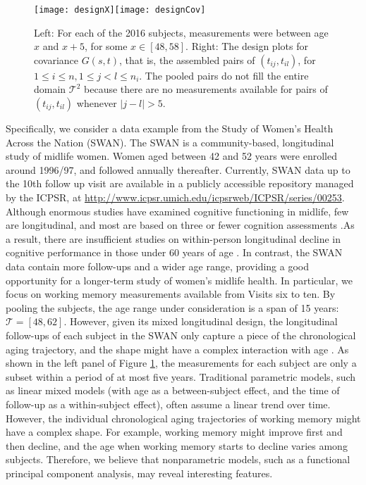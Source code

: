 \documentclass[11pt]{article}
\newcommand{\0}{{\mathbf{0}}}
\newcommand{\1}{{\mathbf{1}}}
\begin{document}
\begin{figure}[ht]
	\centerline{
		\texttt{[image: designX]}\texttt{[image: designCov]}	}
	\caption{Left: For each of the 2016 subjects, measurements were between age $x$ and $x+5$, for some $x \in [48, 58]$. Right: The design plots for covariance $G(s,t)$, that is, the assembled pairs of $(t_{ij}, t_{il})$, for $1\leq i\leq n, 1\leq j <l \leq n_i$. The pooled pairs do not fill the entire domain $\mathcal{T}^2$ because there are no measurements available for pairs of $(t_{ij},t_{il})$ whenever $|j-l| > 5$.}
	\label{Fig:design}
\end{figure}

Specifically, we consider a data example from the Study of Women's Health Across the Nation (SWAN). The SWAN is a community-based, longitudinal study of midlife women. Women aged between 42 and 52 years were enrolled around 1996/97, and followed annually thereafter. Currently, SWAN data up to the 10th follow up visit are available in a publicly accessible repository managed by the ICPSR, at \url{http://www.icpsr.umich.edu/icpsrweb/ICPSR/series/00253}. Although enormous studies have examined cognitive functioning in midlife, few are longitudinal, and most are based on three or fewer cognition assessments \citep{karlamangla2017evidence}.As a result, there are insufficient studies on within-person longitudinal decline in cognitive performance in those under 60 years of age \citep{hedden2004insights,ronnlund2005stability}. In contrast, the SWAN data contain more follow-ups and a wider age range, providing a good opportunity for a longer-term study of women's midlife health. In particular, we focus on working memory measurements available from Visits six to ten. By pooling the subjects, the age range under consideration is a span of 15 years: $\mathcal{T} = [48, 62]$. However, given its mixed longitudinal design, the longitudinal follow-ups of each subject in the SWAN only capture a piece of the chronological aging trajectory, and the shape might have a complex interaction with age \citep{ronnlund2005stability,fuh2006longitudinal}. As shown in the left panel of Figure \ref{Fig:design}, the measurements for each subject are only a subset within a period of at most five years. Traditional parametric models, such as linear mixed models (with age as a between-subject effect, and the time of follow-up as a within-subject effect), often assume a linear trend over time. However, the individual chronological aging trajectories of working memory might have a complex shape. For example, working memory might improve first and then decline, and the age when working memory starts to decline varies among subjects. Therefore, we believe that nonparametric models, such as a functional principal component analysis, may reveal interesting features. 
\end{document}

